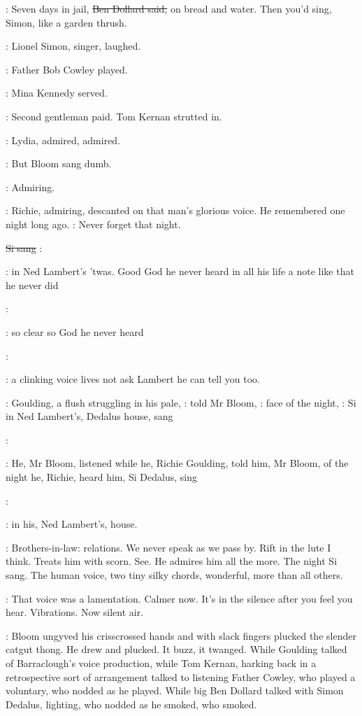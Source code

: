 \dollard:
Seven days in jail,
\sout{Ben Dollard said,}
on bread and water.
Then you'd
sing,
Simon,
like a garden thrush.

:
Lionel Simon,
singer,
laughed.

:
Father Bob Cowley played.

:
Mina Kennedy served.

:
Second gentleman paid.
Tom Kernan strutted in.

:
Lydia,
admired,
admired.

:
But Bloom sang dumb.

:
Admiring.

:
Richie,
admiring,
descanted on that man's glorious voice.
He
remembered one night long ago.
\BloomInt:
Never forget that night.

\sout{Si sang}
\simon:

\BloomInt:
in Ned Lambert's 'twas.
Good God he never heard in all his
life a note like that he never did

\simon:

\BloomInt:
so clear so God he never heard

\simon:

\BloomInt:
a clinking voice lives
not ask Lambert he can tell you too.

:
Goulding,
a flush struggling in his pale,
:
told Mr Bloom,
:
face of the night,
\goulding:
Si in Ned Lambert's,
Dedalus house,
sang

\simon:

:
He,
Mr Bloom,
listened while he,
Richie Goulding,
told him,
Mr
Bloom,
of the night he,
Richie,
heard him,
Si Dedalus,
sing

\simon:

:
in his,
Ned Lambert's,
house.

\BloomInt:
Brothers-in-law:
relations.
We never speak as we pass by.
Rift in the
lute I think.
Treats him with scorn.
See.
He admires him all the more.
The
night Si sang.
The human voice,
two tiny silky chords,
wonderful,
more
than all others.

\BloomInt:
That voice was a lamentation.
Calmer now.
It's in the silence after
you feel you hear.
Vibrations.
Now silent air.

:
Bloom ungyved his crisscrossed hands and with slack fingers plucked
the slender catgut thong.
He drew and plucked.
It buzz,
it twanged.
While
Goulding talked of Barraclough's voice production,
while Tom Kernan,
harking back in a retrospective sort of arrangement talked to listening
Father Cowley,
who played a voluntary,
who nodded as he played.
While
big Ben Dollard talked with Simon Dedalus,
lighting,
who nodded as he
smoked,
who smoked.

